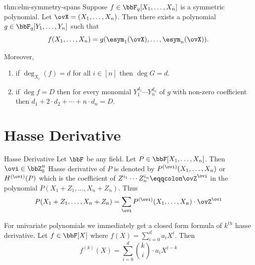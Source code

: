 \begin{Theorem}{}{thm:elm-symmetry-spans}
  Suppose $f\in\bbF_q[X_1,\dots,X_n]$ is a symmetric polynomial. Let $\ovX=(X_1,\dots, X_n)$. Then there exists a polynomial $g\in \bbF_q[Y_1,\dots,Y_n]$ such that $$f(X_1,\dots, X_n)=g(\esym_1(\ovX),\dots,\esym_n(\ovX)).$$

  Moreover, \begin{enumerate}[label=(\roman*)]
    \item if $\deg_{X_i}(f)=d$ for all $i\in[n]$ then $\deg G=d$.
    \item if $\deg f=D$ then for every monomial $Y_1^{d_1}\cdots Y_n^{d_n}$  of $g$ with non-zero coefficient then $d_1+2\cdot d_2+\cdots +n\cdot d_n= D$.
  \end{enumerate}
\end{Theorem}

\section{Hasse Derivative}
\begin{Definition}{Hasse Derivative}{}
  Let $\bbF$ be any field. Let $P\in\bbF[X_1,\dots,X_n]$. Then $\ovi\in \bbZ_0^n$ Hasse derivative of $P$ is denoted by $P^{(\ovi)}(X_1,\dots, X_n)$ or $H^{(\ovi)}(P)$ which is the coefficient of $Z^{i_1}\cdots Z_n^{i_n}\eqqcolon \ovZ^{\ovi}$ in the polynomial  $P(X_1+Z_1,\dots, X_n+Z_n)$. Thus $$P(X_1+Z_1,\dots, X_n+Z_n)= \sum_{\ovi} P^{(\ovi)}(X_1,\dots, X_n)\cdot \ovZ^{ \ovi}$$
\end{Definition}

For univariate polynomials we immediately get a closed form formula of $k^{th}$ hasse derivative. Let $f\in\bbF[X]$ where $f(X)=\sum_{i=0}^da_iX^i$. Then $$f^{(k)}(X)=\sum_{i=0}^d \binom{k}{i}\cdot a_iX^{i-k}$$

